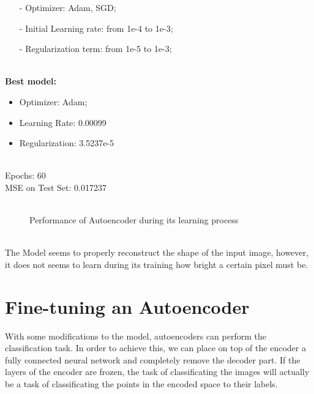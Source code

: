 \documentclass[11pt,a4paper,twocolumn]{IEEEtran}
\newcommand{\thinsepline}{\noindent\makebox[\linewidth]{\rule{7.5cm}{0.02pt}}}
\newcommand{\thinnersepline}{\noindent\makebox[\linewidth]{\rule{7.5cm}{0.01pt}}}
\begin{document}
		\begin{itemize}
			\item[-] Optimizer: Adam, SGD;
			\item[-] Initial Learning rate: from 1e-4 to 1e-3;
			\item[-] Regularization term: from 1e-5 to 1e-3;
		\end{itemize}
		\thinsepline\\
		\textbf{Best model:}
		\begin{itemize}
			\item Optimizer: Adam;
			\item Learning Rate: 0.00099
			\item Regularization: 3.5237e-5
		\end{itemize}
		\thinnersepline\\
		Epochs: 60\\
		MSE on Test Set: 0.017237\\
		\thinsepline\\
		\begin{figure}[h]
			\centering
			
			\caption{Performance of Autoencoder during its learning process}
			\label{fig:recproc}
		\end{figure}\\
	The Model seems to properly reconstruct the shape of the input image, however, it does not seems to learn during its training how bright a certain pixel must be. 
	\section{\textbf{Fine-tuning an Autoencoder}}
	With some modifications to the model, autoencoders can perform the classification task. In order to achieve this, we can place on top of the encoder a fully connected neural network and completely remove the decoder part. If the layers of the encoder are frozen, the task of classificating the images will actually be a task of classificating the points in the encoded space to their labels.
\end{document}
